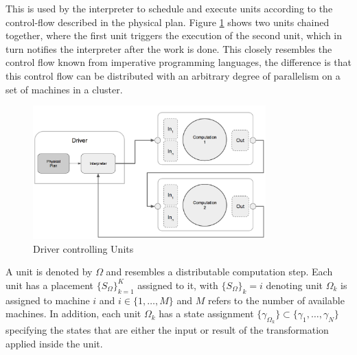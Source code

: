 This is used by the interpreter to schedule and execute units according to the control-flow described in the physical plan.
Figure \ref{fig:driver_units} shows two units chained together, where the first unit triggers the execution of the second unit, which in turn notifies the interpreter after the work is done.
This closely resembles the control flow known from imperative programming languages, the difference is that this control flow can be distributed with an arbitrary degree of parallelism on a set of machines in a cluster.
\begin{figure}[ht]
\centering
\includegraphics[width=0.8\textwidth]{img/driver_units.png}
\caption{Driver controlling Units}
\label{fig:driver_units}
\end{figure}
\begin{definition}
A unit is denoted by $\Omega$ and resembles a distributable computation step.
Each unit has a placement $\{S_\Omega\}_{k=1}^K$ assigned to it, with $\{S_\Omega\}_k = i$ denoting unit $\Omega_k$ is assigned to machine $i$ and $i \in \{1, \ldots, M\}$ and $M$ refers to the number of available machines.
In addition, each unit $\Omega_k$ has a state assignment $\{\gamma_{\Omega_k}\} \subset \{\gamma_1, \ldots, \gamma_N\}$ specifying the states that are either the input or result of the transformation applied inside the unit.
\end{definition}

